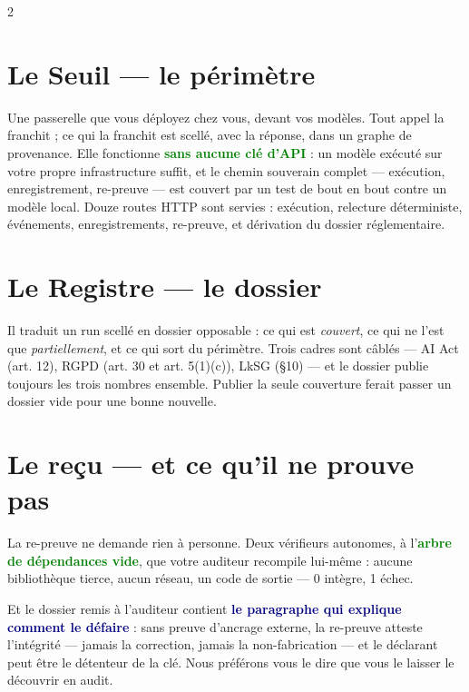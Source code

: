\documentclass[11pt]{article}
\newcommand{\mm}[1]{\textbf{\textcolor{navy}{#1}}}
\newcommand{\ok}[1]{\textcolor{green}{\textbf{#1}}}
\begin{document}
\begin{multicols}{2}

\section{Le Seuil — le périmètre}
Une passerelle que vous déployez chez vous, devant vos modèles. Tout appel la franchit ; ce qui la franchit est scellé, avec la réponse, dans un graphe de provenance. Elle fonctionne \ok{sans aucune clé d'API} : un modèle exécuté sur votre propre infrastructure suffit, et le chemin souverain complet — exécution, enregistrement, re-preuve — est couvert par un test de bout en bout contre un modèle local. Douze routes HTTP sont servies : exécution, relecture déterministe, événements, enregistrements, re-preuve, et dérivation du dossier réglementaire.

\section{Le Registre — le dossier}
Il traduit un run scellé en dossier opposable : ce qui est \emph{couvert}, ce qui ne l'est que \emph{partiellement}, et ce qui sort du périmètre. Trois cadres sont câblés — AI Act (art. 12), RGPD (art. 30 et art. 5(1)(c)), LkSG (§10) — et le dossier publie toujours les trois nombres ensemble. Publier la seule couverture ferait passer un dossier vide pour une bonne nouvelle.

\section{Le reçu — et ce qu'il ne prouve pas}
La re-preuve ne demande rien à personne. Deux vérifieurs autonomes, à l'\ok{arbre de dépendances vide}, que votre auditeur recompile lui-même : aucune bibliothèque tierce, aucun réseau, un code de sortie — 0 intègre, 1 échec.

\begin{cadre}
Et le dossier remis à l'auditeur contient \mm{le paragraphe qui explique comment le défaire} : sans preuve d'ancrage externe, la re-preuve atteste l'intégrité — jamais la correction, jamais la non-fabrication — et le déclarant peut être le détenteur de la clé. Nous préférons vous le dire que vous le laisser le découvrir en audit.
\end{cadre}


\end{multicols}
\end{document}
